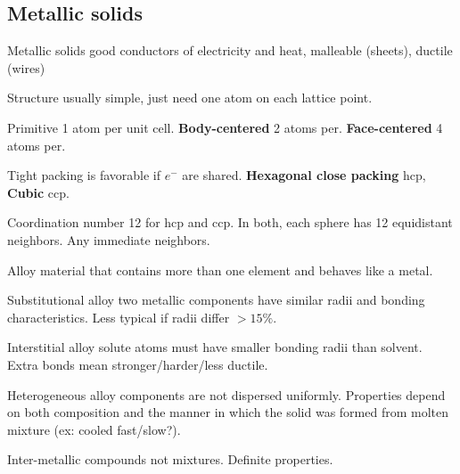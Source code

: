 \begin{mdframed}
    \subsection{Metallic solids}

    \begin{multicols}{3}
\begin{compactdesc}

    \item[Metallic solids] good conductors of electricity and heat, malleable (sheets), ductile (wires)
    \item[Structure] usually simple, just need one atom on each
        lattice point.
    \item[Primitive] 1 atom per unit cell. \textbf{Body-centered} 2 atoms per.
        \textbf{Face-centered} 4 atoms per.

    \item[Tight packing] is favorable if $e^-$ are shared.
        \textbf{Hexagonal close packing} hcp, \textbf{Cubic} ccp.
    \item[Coordination number] 12 for hcp and ccp. In both,
        each sphere has 12 equidistant neighbors. Any immediate neighbors.

    \item[Alloy] material that contains more than one element and behaves like
        a metal.
    \item[Substitutional alloy] two metallic components have similar radii and
        bonding characteristics. Less typical if radii differ $>15\%$.
    \item[Interstitial alloy] solute atoms must have smaller bonding radii
        than solvent. Extra bonds mean stronger/harder/less ductile.
    \item[Heterogeneous alloy] components are not dispersed uniformly.
        Properties depend on both composition and the manner in which the solid
        was formed from molten mixture (ex: cooled fast/slow?).
    \item[Inter-metallic compounds] not mixtures. Definite properties.

\end{compactdesc}
\end{multicols}
\end{mdframed}



